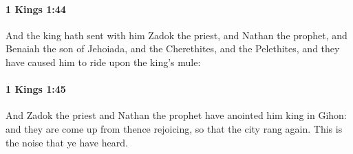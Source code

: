 		\paragraph{1 Kings 1:44} %
			\label{1KINGS-1-44}

			And the king hath sent with him Zadok the priest, and Nathan the prophet, and Benaiah the son of Jehoiada, and the Cherethites, and the Pelethites, and they have caused him to ride upon the king’s mule:


		\paragraph{1 Kings 1:45} %
			\label{1KINGS-1-45}

			And Zadok the priest and Nathan the prophet have anointed him king in Gihon: and they are come up from thence rejoicing, so that the city rang again. This is the noise that ye have heard.

